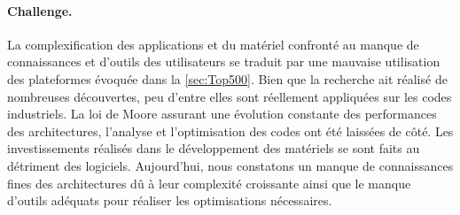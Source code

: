         \paragraph{Challenge.}  
        
            La complexification des applications et du matériel confronté au manque de connaissances et d'outils des utilisateurs se traduit par une mauvaise utilisation des plateformes évoquée dans la \autoref{sec:Top500}. Bien que la recherche ait réalisé de nombreuses découvertes, peu d'entre elles sont réellement appliquées sur les codes industriels. La loi de Moore assurant une évolution constante des performances des architectures, l’analyse et l’optimisation des codes ont été laissées de côté. Les investissements réalisés dans le développement des matériels se sont faits au détriment des logiciels. Aujourd'hui, nous constatons un manque de connaissances fines des architectures dû à leur complexité croissante ainsi que le manque d'outils adéquats pour réaliser les optimisations nécessaires.
        
